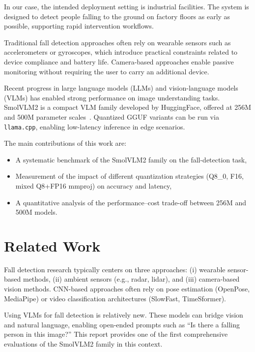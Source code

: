 \documentclass[12pt, a4paper]{article}
\begin{document}
In our case, the intended deployment setting is industrial facilities. The
system is designed to detect people falling to the ground on factory floors as
early as possible, supporting rapid intervention workflows.

Traditional fall detection approaches often rely on wearable sensors such as
accelerometers or gyroscopes, which introduce practical constraints related to
device compliance and battery life. Camera-based approaches enable passive
monitoring without requiring the user to carry an additional device.

Recent progress in large language models (LLMs) and vision-language models
(VLMs) has enabled strong performance on image understanding tasks. SmolVLM2 is
a compact VLM family developed by HuggingFace, offered at 256M and 500M
parameter scales~\cite{smolvlm2}. Quantized GGUF variants can be run via
\texttt{llama.cpp}, enabling low-latency inference in edge scenarios.

The main contributions of this work are:
\begin{itemize}
    \item A systematic benchmark of the SmolVLM2 family on the fall-detection task,
    \item Measurement of the impact of different quantization strategies (Q8\_0, F16, mixed Q8+FP16 mmproj)
          on accuracy and latency,
    \item A quantitative analysis of the performance--cost trade-off between 256M and 500M models.
\end{itemize}

\section{Related Work}

Fall detection research typically centers on three approaches: (i) wearable
sensor-based methods, (ii) ambient sensors (e.g., radar, lidar), and (iii)
camera-based vision methods. CNN-based approaches often rely on pose estimation
(OpenPose, MediaPipe) or video classification architectures (SlowFast,
TimeSformer).

Using VLMs for fall detection is relatively new. These models can bridge vision
and natural language, enabling open-ended prompts such as ``Is there a falling
person in this image?'' This report provides one of the first comprehensive
evaluations of the SmolVLM2 family in this context.
\end{document}
